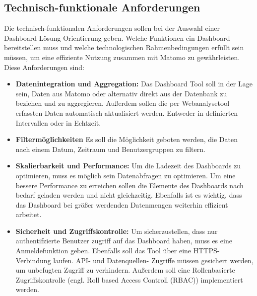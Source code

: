 \subsection{Technisch-funktionale Anforderungen}
Die technisch-funktionalen Anforderungen sollen bei der Auswahl einer Dashboard Lösung Orientierung geben. Welche Funktionen ein Dashboard bereitstellen muss und welche technologischen Rahmenbedingungen erfüllt sein müssen, um eine effiziente Nutzung zusammen mit Matomo zu gewährleisten. Diese Anforderungen sind: 
\begin{itemize}
    \item \textbf{Datenintegration und Aggregation:} Das Dashboard Tool soll in der Lage sein, Daten aus Matomo oder alternativ direkt aus der Datenbank zu beziehen und zu aggregieren. Außerdem sollen die per Webanalysetool erfassten Daten automatisch aktualisiert werden. Entweder in definierten Intervallen oder in Echtzeit.
    \item \textbf{Filtermöglichkeiten} Es soll die Möglichkeit geboten werden, die Daten nach einem Datum, Zeitraum und Benutzergruppen zu filtern.
    \item \textbf{Skalierbarkeit und Performance:} Um die Ladezeit des Dashboards zu optimieren, muss es möglich sein Datenabfragen zu optimieren. Um eine bessere Performance zu erreichen sollen die Elemente des Dashboards nach bedarf geladen werden und nicht gleichzeitig. Ebenfalls ist es wichtig, dass das Dashboard bei größer werdenden Datenmengen weiterhin effizient arbeitet.
    \item \textbf{Sicherheit und Zugriffskontrolle:} Um sicherzustellen, dass nur authentifzierte Benutzer zugriff auf das Dashboard haben, muss es eine Anmeldefunktion geben. Ebenfalls soll das Tool über eine HTTPS-Verbindung laufen. API- und Datenquellen- Zugriffe müssen gesichert werden, um unbefugten Zugriff zu verhindern. Außerdem soll eine Rollenbasierte Zugriffskontrolle (engl. Roll based Access Controll (RBAC)) implementiert werden.
\end{itemize}

